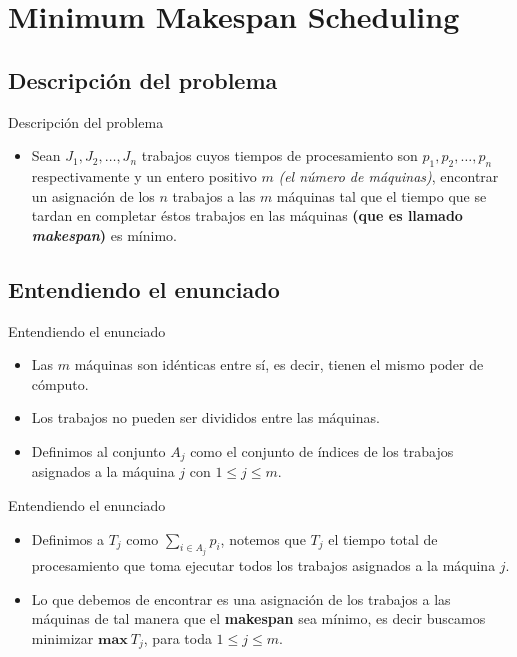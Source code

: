 \renewcommand{\sectiontitle}{Minimum Makespan Scheduling}
\section{\sectiontitle}

\renewcommand{\subsectiontitle}{Descripción del problema}
\subsection{\subsectiontitle}

\begin{frame}{\subsectiontitle}
    \begin{itemize}
        \item Sean \(J_{1}, J_{2}, \dotsc, J_{n}\) trabajos cuyos tiempos de procesamiento son \(p_{1}, p_{2}, \dotsc, p_{n}\)
        respectivamente y un entero positivo \(m\) \textit{(el número de máquinas)}, encontrar un asignación de los 
        \(n\) trabajos a las \(m\) máquinas tal que el tiempo que se tardan en completar éstos trabajos en las máquinas
        \textbf{(que es llamado \textit{makespan})} es mínimo.
    \end{itemize}
\end{frame}

\renewcommand{\subsectiontitle}{Entendiendo el enunciado}
\subsection{\subsectiontitle}

\begin{frame}{\subsectiontitle}
    \begin{itemize}
    \item Las \(m\) máquinas son idénticas entre sí, es decir, tienen el mismo poder de cómputo.
    \item Los trabajos no pueden ser divididos entre las máquinas.
    \item Definimos al conjunto \(A_{j}\) como el conjunto de índices de los trabajos asignados a la máquina \(j\) con \(1 \leq j \leq m\).
\end{itemize}
\end{frame}

\begin{frame}{\subsectiontitle}
    \begin{itemize}
        \item Definimos a \(T_{j}\) como \(\displaystyle\sum_{i \in A_{j}} p_{i}\), notemos que \(T_{j}\) el tiempo total 
        de procesamiento que toma ejecutar todos los trabajos asignados a la máquina \(j\).
        \item Lo que debemos de encontrar es una asignación de los trabajos a las máquinas de tal manera que el \textbf{makespan}
        sea mínimo, es decir buscamos minimizar \(\mathbf{max} \ T_{j}\), para toda \(1 \leq j \leq m\).
    \end{itemize}
\end{frame}

